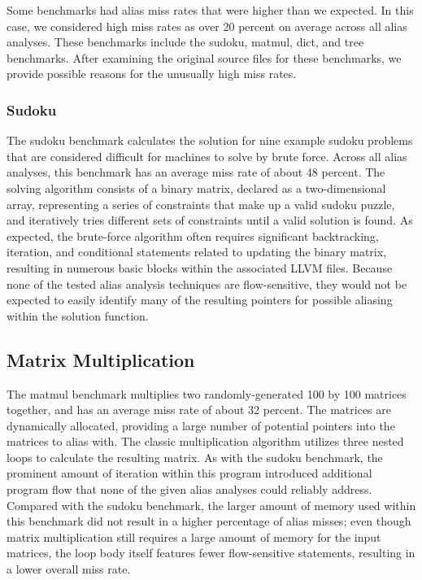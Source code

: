 Some benchmarks had alias miss rates that were higher than we expected. In this case, we considered high miss rates as over 20 percent on average across all alias analyses. These benchmarks include the sudoku, matmul, dict, and tree benchmarks. After examining the original source files for these benchmarks, we provide possible reasons for the unusually high miss rates.

\subsubsection{Sudoku}
The sudoku benchmark calculates the solution for nine example sudoku problems that are considered difficult for machines to solve by brute force. Across all alias analyses, this benchmark has an average miss rate of about 48 percent. The solving algorithm consists of a binary matrix, declared as a two-dimensional array, representing a series of constraints that make up a valid sudoku puzzle, and iteratively tries different sets of constraints until a valid solution is found. As expected, the brute-force algorithm often requires significant backtracking, iteration, and conditional statements related to updating the binary matrix, resulting in numerous basic blocks within the associated LLVM files. Because none of the tested alias analysis techniques are flow-sensitive, they would not be expected to easily identify many of the resulting pointers for possible aliasing within the solution function.

\subsection{Matrix Multiplication}
The matmul benchmark multiplies two randomly-generated 100 by 100 matrices together, and has an average miss rate of about 32 percent. The matrices are dynamically allocated, providing a large number of potential pointers into the matrices to alias with. The classic multiplication algorithm utilizes three nested loops to calculate the resulting matrix. As with the sudoku benchmark, the prominent amount of iteration within this program introduced additional program flow that none of the given alias analyses could reliably address. Compared with the sudoku benchmark, the larger amount of memory used within this benchmark did not result in a higher percentage of alias misses; even though matrix multiplication still requires a large amount of memory for the input matrices, the loop body itself features fewer flow-sensitive statements, resulting in a lower overall miss rate.

